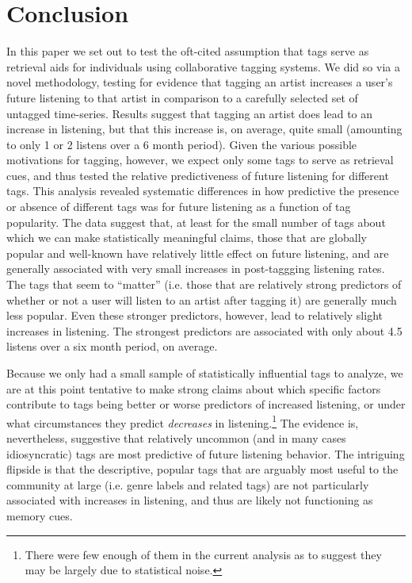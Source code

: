 \section{Conclusion}
\label{sec_conclusion}

In this paper we set out to test the oft-cited assumption that tags serve as retrieval aids for individuals using collaborative tagging systems.  We did so via a novel methodology, testing for evidence that tagging an artist increases a user's future listening to that artist in comparison to a carefully selected set of untagged time-series. Results suggest that tagging an artist does lead to an increase in listening, but that this increase is, on average, quite small (amounting to only 1 or 2 listens over a 6 month period). Given the various possible motivations for tagging, however, we expect only some tags to serve as retrieval cues, and thus tested the relative predictiveness of future listening for different tags. This analysis revealed systematic differences in how predictive the presence or absence of different tags was for future listening as a function of tag popularity. The data suggest that, at least for the small number of tags about which we can make statistically meaningful claims, those that are globally popular and well-known have relatively little effect on future listening, and are generally associated with very small increases in post-taggging listening rates. The tags that seem to ``matter'' (i.e. those that are relatively strong predictors of whether or not a user will listen to an artist after tagging it) are generally much less popular. Even these stronger predictors, however, lead to relatively slight increases in listening. The strongest predictors are associated with only about 4.5 listens over a six month period, on average. %

Because we only had a small sample of statistically influential tags to analyze, we are at this point tentative to make strong claims about which specific factors contribute to tags being better or worse predictors of increased listening, or under what circumstances they predict \emph{decreases} in listening.\footnote{There were few enough of them in the current analysis as to suggest they may be largely due to statistical noise.} The evidence is, nevertheless, suggestive that relatively uncommon (and in many cases idiosyncratic) tags are most predictive of future listening behavior. The intriguing flipside is that the descriptive, popular tags that are arguably most useful to the community at large (i.e. genre labels and related tags) are not particularly associated with increases in listening, and thus are likely not functioning as memory cues.

